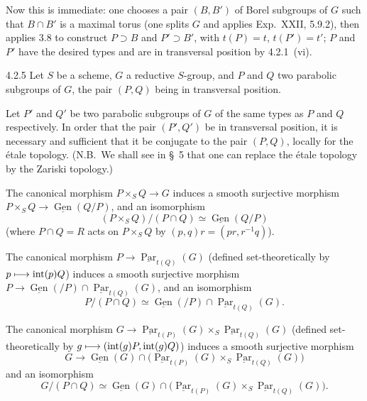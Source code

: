 Now this is immediate: one chooses a pair $(B,B')$ of Borel subgroups of $G$ such that $B\cap B'$ is a maximal torus (one splits $G$ and applies Exp.~XXII, 5.9.2), then applies 3.8 to construct $P\supset B$ and $P'\supset B'$, with $t(P)=t$, $t(P')=t'$; $P$ and $P'$ have the desired types and are in transversal position by 4.2.1~(vi).
\begin{corollary}{4.2.5}\label{XXVI.4.2.5}
Let $S$ be a scheme, $G$ a reductive $S$-group, and $P$ and $Q$ two parabolic subgroups of $G$, the pair $(P,Q)$ being in transversal position.
\begin{enumeratei}
\item Let $P'$ and $Q'$ be two parabolic subgroups of $G$ of the same types as $P$ and $Q$ respectively. In order that the pair $(P',Q')$ be in transversal position, it is necessary and sufficient that it be conjugate to the pair $(P,Q)$, locally for the \'etale topology. (N.B.~We shall see in \S~5 that one can replace the \'etale topology by the Zariski topology.)
\item The canonical morphism $P\times_S Q\to G$ induces a smooth surjective morphism $P\times_S Q\to\underline{\operatorname{Gen}}(Q/P)$, and an isomorphism
\[
(P\times_S Q)/(P\cap Q)\simeq\underline{\operatorname{Gen}}(Q/P)
\]
(where $P\cap Q=R$ acts on $P\times_S Q$ by $(p,q)r=(pr,r^{-1}q)$).
\item The canonical morphism $P\to\underline{\operatorname{Par}}_{t(Q)}(G)$ (defined set-theoretically by $p\longmapsto\operatorname{int}(p)Q$) induces a smooth surjective morphism $P\to\underline{\operatorname{Gen}}(/P)\cap\underline{\operatorname{Par}}_{t(Q)}(G)$, and an isomorphism
\[
P/(P\cap Q)\simeq\underline{\operatorname{Gen}}(/P)\cap\underline{\operatorname{Par}}_{t(Q)}(G).
\]
\item The canonical morphism $G\to\underline{\operatorname{Par}}_{t(P)}(G)\times_S\underline{\operatorname{Par}}_{t(Q)}(G)$ (defined set-theoretically by $g\longmapsto(\operatorname{int}(g)P,\operatorname{int}(g)Q)$) induces a smooth surjective morphism
\[
G\to\underline{\operatorname{Gen}}(G)\cap\bigl(\underline{\operatorname{Par}}_{t(P)}(G)\times_S\underline{\operatorname{Par}}_{t(Q)}(G)\bigr)
\]
and an isomorphism
\[
G/(P\cap Q)\simeq\underline{\operatorname{Gen}}(G)\cap\bigl(\underline{\operatorname{Par}}_{t(P)}(G)\times_S\underline{\operatorname{Par}}_{t(Q)}(G)\bigr).
\]
\end{enumeratei}
\end{corollary}
